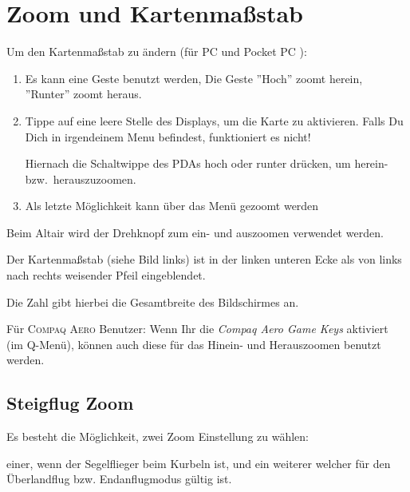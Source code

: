\section{Zoom und Kartenmaßstab}\label{zoom}\label{kartenmasstab}
Um den Kartenmaßstab zu ändern  (für \textsf{PC}  und  \textsf{Pocket PC} ):
\begin{enumerate}
\item Es kann eine Geste benutzt werden, Die Geste 
     ''Hoch'' zoomt herein,  ''Runter'' zoomt heraus.
  \item Tippe auf eine leere Stelle des Displays, um die Karte zu aktivieren. Falls Du Dich in irgendeinem Menu befindest, funktioniert es nicht! 

  Hiernach die Schaltwippe des \textsf{PDA}s hoch oder runter drücken, um herein- bzw.\ herauszuzoomen.
  
     \item Als letzte Möglichkeit kann über das Menü gezoomt werden
\end{enumerate}

Beim Altair wird der Drehknopf zum ein- und auszoomen verwendet werden.

Der Kartenmaßstab (siehe Bild links)  ist in der linken unteren Ecke als von links nach rechts weisender Pfeil eingeblendet.  

Die Zahl gibt hierbei die Gesamtbreite des Bildschirmes an.

Für \textsc{Compaq Aero} Benutzer: Wenn Ihr die \textsl{Compaq Aero Game Keys} aktiviert (im Q-Menü), können auch diese für das Hinein- und Herauszoomen benutzt werden.

\subsection*{Steigflug Zoom}
Es besteht die Möglichkeit, zwei Zoom Einstellung zu wählen: 

einer, wenn der Segelflieger beim Kurbeln ist, und ein weiterer welcher für den  Überlandflug bzw. Endanflugmodus gültig ist.


